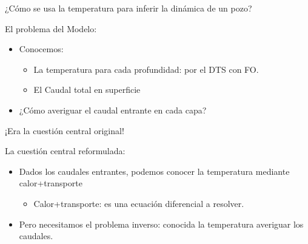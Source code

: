 \documentclass[presentation]{beamer}
\begin{document}
\begin{frame}{¿Cómo se usa la temperatura para inferir la dinámica de un pozo?}
	\begin{block}{El problema del Modelo:}
		\begin{itemize}
			\item Conocemos:
			\begin{itemize}
				\item La temperatura para cada profundidad: por el DTS con FO.
				\item El Caudal total en superficie
			\end{itemize}
			\item ¿Cómo averiguar el caudal entrante en cada capa?
		\end{itemize}
		¡Era la cuestión central original!
	\end{block}

	\begin{block}{La cuestión central reformulada:}
	\begin{itemize}
		\item Dados los caudales entrantes, podemos conocer la temperatura mediante calor+transporte
		\begin{itemize}
			\item Calor+transporte: es una ecuación diferencial a resolver.
		\end{itemize}
		\item Pero necesitamos el problema inverso: conocida la temperatura averiguar los caudales.
	\end{itemize}
\end{block}

\end{frame}
%	
%		
\end{document}
